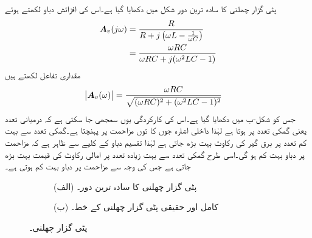 پٹی گزار چھلنی کا سادہ ترین دور شکل  میں دکھایا گیا ہے۔اس کی افزائش دباو لکھتے ہوئے
\begin{gather}
\begin{aligned}\label{مساوات_تعددی_پٹی_گزار_دور_مساوات}
{\ensuremath{{\boldsymbol{A}}}}_v(j\omega)&=\frac{R}{R+j\left(\omega L-\frac{1}{\omega C}\right)}\\
&=\frac{\omega RC}{\omega RC +j(\omega^2 LC-1)}
\end{aligned}
\end{gather}
مقداری تفاعل لکھتے ہیں
\begin{align}\label{مساوات_تعددی_پٹی_گزار_دور_حتمی}
\abs{{{\boldsymbol{A}}}_v(\omega)}&=\frac{\omega RC}{\sqrt{(\omega RC)^2+(\omega^2 LC-1)^2}}
\end{align}
جس کو شکل-ب میں دکھایا گیا ہے۔اس کی کارکردگی یوں سمجھی جا سکتی ہے کہ درمیانی تعدد یعنی گمکی تعدد  پر  ہوتا ہے لہٰذا داخلی اشارہ جوں کا توں مزاحمت پر پہنچتا ہے۔گمکی تعدد سے بہت کم تعدد پر برق گیر کی رکاوٹ بہت بڑھ جاتی ہے  لہٰذا تقسیم دباو کے کلیے سے ظاہر ہے کہ مزاحمت پر دباو بہت کم ہو گی۔اسی طرح گمکی تعدد سے بہت زیادہ تعدد پر امالی رکاوٹ کی قیمت بہت بڑھ جاتی ہے جس کی وجہ سے مزاحمت پر دباو بہت کم ہوتی ہے۔
%
\begin{figure}
\centering
\begin{subfigure}{0.33\textwidth}
\centering
{}
\caption*{(الف) پٹی گزار چھلنی کا سادہ ترین دور۔}
\end{subfigure}%
\begin{subfigure}{0.66\textwidth}
\centering
{}
\caption*{(ب) کامل اور حقیقی پٹی گزار چھلنی کے خط۔}
\end{subfigure}
\caption{پٹی گزار چھلنی۔}
\label{شکل_تعدد_کامل_پٹی_گزار_خصلت}
\end{figure}

